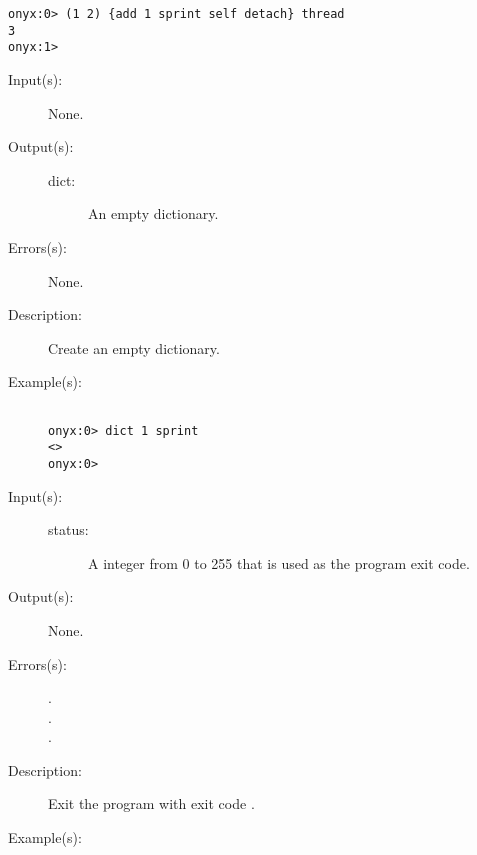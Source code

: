 \begin{description}
\begin{description}
\begin{verbatim}
onyx:0> (1 2) {add 1 sprint self detach} thread
3
onyx:1>
		\end{verbatim}
	\end{description}
\label{systemdict:dict}
\item[{\onyxop{--}{dict}{dict}}: ]
	\begin{description}\item[]
	\item[Input(s): ] None.
	\item[Output(s): ]
		\begin{description}\item[]
		\item[dict: ]
			An empty dictionary.
		\end{description}
	\item[Errors(s): ] None.
	\item[Description: ]
		Create an empty dictionary.
	\item[Example(s): ]\begin{verbatim}

onyx:0> dict 1 sprint
<>
onyx:0>
		\end{verbatim}
	\end{description}
\label{systemdict:die}
\item[{\onyxop{status}{die}{--}}: ]
	\begin{description}\item[]
	\item[Input(s): ]
		\begin{description}\item[]
		\item[status: ]
			A integer from 0 to 255 that is used as the program exit
			code.
		\end{description}
	\item[Output(s): ] None.
	\item[Errors(s): ]
		\begin{description}\item[]
		\item[.]
		\item[.]
		\item[.]
		\end{description}
	\item[Description: ]
		Exit the program with exit code .
	\item[Example(s): ]\begin{verbatim}


\end{verbatim}
\end{description}
\end{description}
